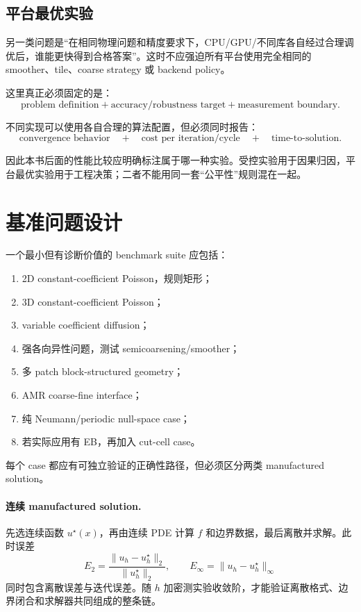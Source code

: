 \subsection{平台最优实验}

另一类问题是“在相同物理问题和精度要求下，CPU/GPU/不同库各自经过合理调优后，谁能更快得到合格答案”。这时不应强迫所有平台使用完全相同的 smoother、tile、coarse strategy 或 backend policy。

这里真正必须固定的是：
\begin{equation}
\boxed{
\text{problem definition}
+
\text{accuracy/robustness target}
+
\text{measurement boundary}.
}
\end{equation}

不同实现可以使用各自合理的算法配置，但必须同时报告：
\begin{equation}
\boxed{
\text{convergence behavior}
\quad+\quad
\text{cost per iteration/cycle}
\quad+\quad
\text{time-to-solution}.
}
\end{equation}

因此本书后面的性能比较应明确标注属于哪一种实验。受控实验用于因果归因，平台最优实验用于工程决策；二者不能用同一套“公平性”规则混在一起。

\section{基准问题设计}

一个最小但有诊断价值的 benchmark suite 应包括：
\begin{enumerate}
\item 2D constant-coefficient Poisson，规则矩形；
\item 3D constant-coefficient Poisson；
\item variable coefficient diffusion；
\item 强各向异性问题，测试 semicoarsening/smoother；
\item 多 patch block-structured geometry；
\item AMR coarse-fine interface；
\item 纯 Neumann/periodic null-space case；
\item 若实际应用有 EB，再加入 cut-cell case。
\end{enumerate}

每个 case 都应有可独立验证的正确性路径，但必须区分两类 manufactured solution。

\paragraph{连续 manufactured solution.}
先选连续函数 $u^\star(x)$，再由连续 PDE 计算 $f$ 和边界数据，最后离散并求解。此时误差
\begin{equation}
E_2=\frac{\|u_h-u^\star_h\|_2}{\|u^\star_h\|_2},
\qquad
E_\infty=\|u_h-u^\star_h\|_\infty
\end{equation}
同时包含离散误差与迭代误差。随 $h$ 加密测实验收敛阶，才能验证离散格式、边界闭合和求解器共同组成的整条链。

